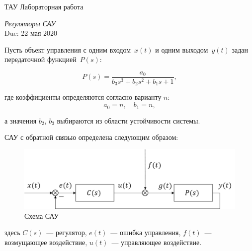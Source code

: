 \documentclass[a4paper,oneside,10pt]{book}
\theoremstyle{definition}
\begin{document}
\begin{center}
	{\large  ТАУ \hspace{0.1cm} Лабораторная работа }

	\vspace{5pt}
	\textit{\large Регуляторы САУ}\\ %
	\vspace{10pt}
	Due: 22 мая 2020 %
\end{center}

\vspace{0.2 cm}



Пусть объект управления с одним входом~$ x(t) $ и одним выходом~$ y(t) $ задан передаточной функцией~$ P(s) $:

\begin{equation*}
	P(s) =
	\dfrac{a_0}
	{b_3 s^3 + b_2 s^2 + b_1 s +1} ,
\end{equation*}

где коэффициенты  определяются согласно варианту $ n $:
\begin{equation*}
	a_0 = n, \quad b_1 = n,
\end{equation*}

а значения $b_2$, $b_3$ выбираются из области устойчивости системы.

САУ с обратной связью определена следующим образом:

\begin{figure}[h]
	\centering
	\includegraphics[width=0.8\linewidth]{tau.png}
	\caption{Схема САУ}
\end{figure}
здесь $C(s)$~--- регулятор,
$e(t)$~--- ошибка управления,
$f(t)$~--- возмущающее воздействие,
$u(t)$~--- управляющее воздействие.
\end{document}
